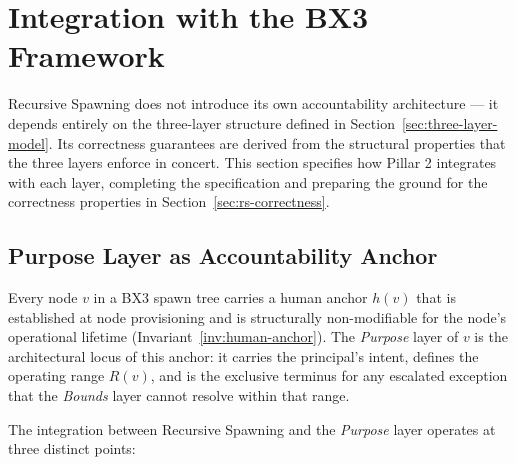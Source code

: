 \section{Integration with the BX3 Framework}
\label{sec:rs-integration}

Recursive Spawning does not introduce its own accountability architecture — it
depends entirely on the three-layer structure defined in Section~\ref{sec:three-layer-model}.
Its correctness guarantees are derived from the structural properties that the
three layers enforce in concert.  This section specifies how Pillar 2 integrates
with each layer, completing the specification and preparing the ground for the
correctness properties in Section~\ref{sec:rs-correctness}.

\subsection{Purpose Layer as Accountability Anchor}
\label{sec:rs-purpose-anchor}

Every node $v$ in a BX3 spawn tree carries a human anchor $h(v)$ that is
established at node provisioning and is structurally non-modifiable for the
node's operational lifetime (Invariant~\ref{inv:human-anchor}).  The
\textit{Purpose} layer of $v$ is the architectural locus of this anchor: it
carries the principal's intent, defines the operating range $R(v)$, and is the
exclusive terminus for any escalated exception that the \textit{Bounds} layer
cannot resolve within that range.

The integration between Recursive Spawning and the \textit{Purpose} layer
operates at three distinct points:

